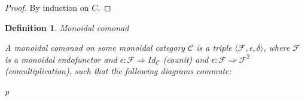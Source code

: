 \documentclass[a4paper]{article}
\newtheorem{defin}{Definition}
\begin{document}
\begin{proof}
  By induction on $C$.
\end{proof}

\begin{defin} Monoidal comonad
  $ $

  A monoidal comonad on some monoidal category $\mathcal{C}$ is a triple $\langle \mathcal{F}, \epsilon, \delta \rangle$,
  where $\mathcal{F}$ is a monoidal endofunctor and $\epsilon : \mathcal{F} \Rightarrow Id_{\mathcal{C}}$ (counit) and $\epsilon : \mathcal{F} \Rightarrow \mathcal{F}^2$ (comultiplication),
  such that the following diagrams commute:

\begin{minipage}{0.45\textwidth}
\begin{small}
\end{small}
\end{minipage}%
\hfill
\begin{minipage}{0.5\textwidth}
\begin{tabular}{p{\textwidth}}
\end{tabular}
\end{minipage}%


\end{defin}
\end{document}

